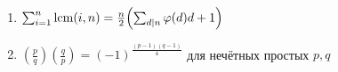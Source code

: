 \begin{enumerate}
\item %
$\sum_{i=1}^n\operatorname{lcm}(i,n)=\frac{n}{2}\Bigl(\sum_{d\mid n}\varphi(d)d+1\Bigr)$

\item %
$\left(\tfrac{p}{q}\right)\left(\tfrac{q}{p}\right)=(-1)^{\frac{(p-1)(q-1)}{4}}$
 для нечётных простых $p,q$

\end{enumerate}

\endgroup


